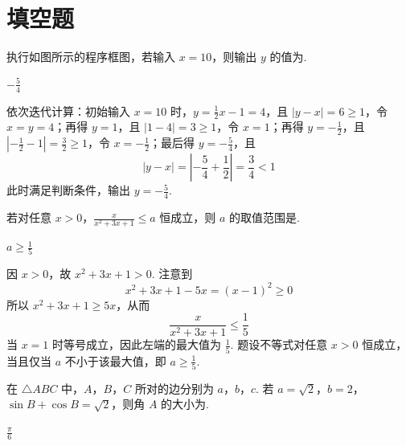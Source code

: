 \section{填空题}

\begin{problem}
执行如图所示的程序框图，若输入 \(x = 10\)，则输出 \(y\) 的值为\fillinblank{}.

\end{problem}

\begin{answer}
\(-\frac{5}{4}\)
\end{answer}

\begin{solution}
依次迭代计算：初始输入 \(x=10\) 时，\(y=\frac12x-1=4\)，且 \(|y-x|=6\geqslant1\)，令 \(x=y=4\)；再得 \(y=1\)，且 \(|1-4|=3\geqslant1\)，令 \(x=1\)；再得 \(y=-\frac12\)，且 \(\left|-\frac12-1\right|=\frac32\geqslant1\)，令 \(x=-\frac12\)；最后得 \(y=-\frac54\)，且
\[
\left|y-x\right|=\left|-\frac54+\frac12\right|=\frac34<1
\]
此时满足判断条件，输出 \(y=-\frac54\).
\end{solution}

\begin{problem}
若对任意 \(x > 0\)，\(\frac{x}{x^2 + 3x + 1} \leqslant a\) 恒成立，则 \(a\) 的取值范围是\fillinblank{}.
\end{problem}

\begin{answer}
\(a \geqslant \frac{1}{5}\)
\end{answer}

\begin{solution}
因 \(x>0\)，故 \(x^2+3x+1>0\). 注意到
\[
x^2+3x+1-5x=(x-1)^2\geqslant0
\]
所以 \(x^2+3x+1\geqslant5x\)，从而
\[
\frac{x}{x^2+3x+1}\leqslant\frac15
\]
当 \(x=1\) 时等号成立，因此左端的最大值为 \(\frac15\). 题设不等式对任意 \(x>0\) 恒成立，当且仅当 \(a\) 不小于该最大值，即 \(a\geqslant\frac15\).
\end{solution}

\begin{problem}
在 \(\triangle ABC\) 中，\(A\)，\(B\)，\(C\) 所对的边分别为 \(a\)，\(b\)，\(c\). 若 \(a = \sqrt{2}\)，\(b = 2\)，\(\sin B + \cos B = \sqrt{2}\)，则角 \(A\) 的大小为\fillinblank{}.
\end{problem}

\begin{answer}
\(\frac{\pi}{6}\)
\end{answer}

